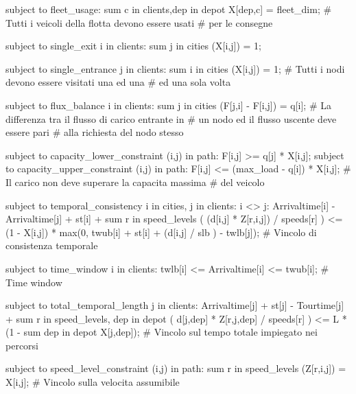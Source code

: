 			\begin{amplcode}
				subject to fleet_usage:
					sum {c in clients,dep in depot} X[dep,c] = fleet_dim;
									# Tutti i veicoli della flotta devono essere usati
									# per le consegne

				subject to single_exit {i in clients}:
					sum {j in cities} (X[i,j]) = 1; 
					
				subject to single_entrance {j in clients}:
					sum {i in cities} (X[i,j]) = 1;
									# Tutti i nodi devono essere visitati una ed una
									# ed una sola volta

				subject to flux_balance {i in clients}:
					sum {j in cities} (F[j,i] - F[i,j]) = q[i];
									# La differenza tra il flusso di carico entrante in 
									# un nodo ed il flusso uscente deve essere pari 
									# alla richiesta del nodo stesso

				subject to capacity_lower_constraint {(i,j) in path}:
					F[i,j] >= q[j] * X[i,j];
				subject to capacity_upper_constraint {(i,j) in path}:
					F[i,j] <= (max_load - q[i]) * X[i,j];
									# Il carico non deve superare la capacita massima
									# del veicolo

				subject to temporal_consistency {i in cities, j in clients: i <> j}:
					Arrivaltime[i] - Arrivaltime[j] + st[i] +
					sum {r in speed_levels} (
						(d[i,j] * Z[r,i,j]) / speeds[r]	
					) <= (1 - X[i,j]) * max(0, twub[i] + st[i] + (d[i,j] / slb ) - twlb[j]);
									# Vincolo di consistenza temporale
										
				subject to time_window {i in clients}:
					twlb[i] <= Arrivaltime[i] <= twub[i];
									# Time window

				subject to total_temporal_length {j in clients}:
					Arrivaltime[j] + st[j] - Tourtime[j] + 
					sum {r in speed_levels, dep in depot} (
						d[j,dep] * Z[r,j,dep] / speeds[r]
					) <= L * (1 - sum {dep in depot} X[j,dep]);
									# Vincolo sul tempo totale impiegato nei percorsi

				subject to speed_level_constraint {(i,j) in path}:
					sum {r in speed_levels} (Z[r,i,j]) = X[i,j];
									# Vincolo sulla velocita assumibile
			\end{amplcode}


	
